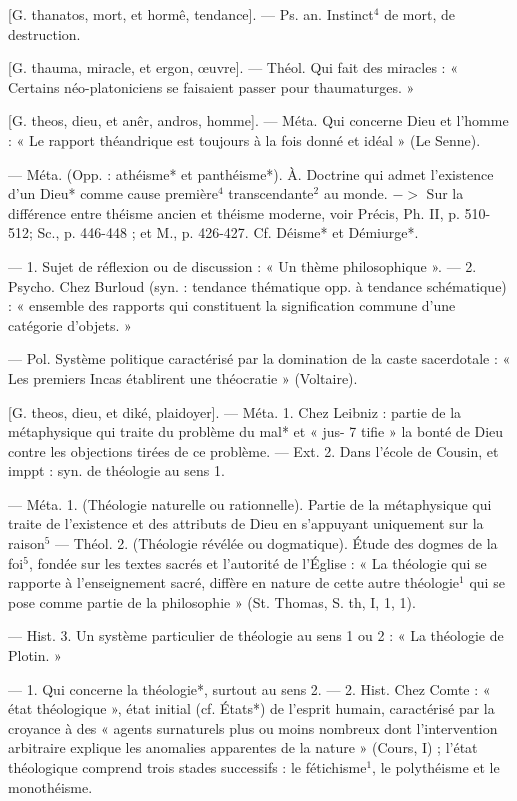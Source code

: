 \begin{itemize}[leftmargin=1cm, label=, itemsep=1pt]
 [G. thanatos, mort, et
hormê, tendance]. — Ps. an. Instinct$^4$
de mort, de destruction.

 [G. thauma, miracle, et
ergon, œuvre]. — Théol. Qui fait
des miracles : « Certains néo-platoniciens se faisaient passer pour
thaumaturges. »

 [G. theos, dieu, et anêr,
andros, homme]. — Méta. Qui concerne Dieu et l’homme : « Le rapport
théandrique est toujours à la fois
donné et idéal » (Le Senne).

 — Méta. (Opp. : athéisme* et
panthéisme*). À. Doctrine qui admet
l'existence d’un Dieu* comme cause
première$^4$ transcendante$^2$ au monde.
$->$ Sur la différence entre théisme
ancien et théisme moderne, voir
Précis, Ph. II, p. 510-512; Sc.,
p. 446-448 ; et M., p. 426-427. Cf.
Déisme* et Démiurge*.

 — 1. Sujet de réflexion ou de
discussion : « Un thème philosophique ». — 2. Psycho. Chez Burloud (syn. : tendance thématique opp.
à tendance schématique) : « ensemble
des rapports qui constituent la signification commune d’une catégorie d'objets. »

 — Pol. Système politique
caractérisé par la domination de la
caste sacerdotale : « Les premiers
Incas établirent une théocratie »
(Voltaire).

 [G. theos, dieu, et diké, plaidoyer]. — Méta. 1. Chez Leibniz :
partie de la métaphysique qui
traite du problème du mal* et « jus- 7
tifie » la bonté de Dieu contre les
objections tirées de ce problème. —
Ext. 2. Dans l'école de Cousin, et
imppt : syn. de théologie au sens 1.

 — Méta. 1. (Théologie naturelle ou rationnelle). Partie de la
métaphysique qui traite de l’existence et des attributs de Dieu en
s'appuyant uniquement sur la
raison$^5$ — Théol. 2. (Théologie révélée ou dogmatique). Étude des
dogmes de la foi$^5$, fondée sur les
textes sacrés et l'autorité de l’Église :
« La théologie qui se rapporte à
l’enseignement sacré, diffère en nature de cette autre théologie$^1$ qui
se pose comme partie de la philosophie » (St. Thomas, S. th, I, 1, 1).

— Hist. 3. Un système particulier de théologie au sens 1 ou 2 : « La
théologie de Plotin. »

 — 1. Qui concerne la
théologie*, surtout au sens 2. —
2. Hist. Chez Comte : « état théologique », état initial (cf. États*) de
l'esprit humain, caractérisé par la
croyance à des « agents surnaturels
plus ou moins nombreux dont l’intervention arbitraire explique les
anomalies apparentes de la nature »
(Cours, I) ; l’état théologique comprend trois stades successifs : le
fétichisme$^1$, le polythéisme et le monothéisme.


\end{itemize}
